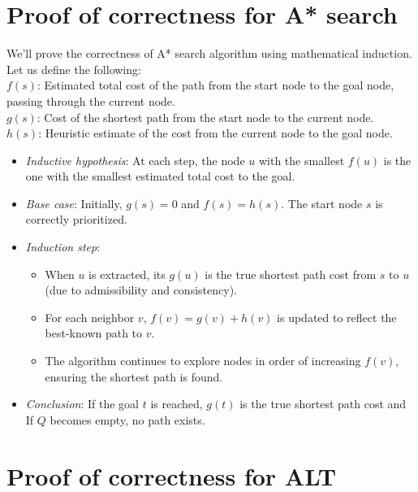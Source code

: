 \begin{appendices}
	\section{Proof of correctness for A* search}\label{appendix:astar:correctness}
	We'll prove the correctness of A* search algorithm using mathematical induction. Let us define the following: \\
	$f(s)$: Estimated total cost of the path from the start node to the goal node, passing through the current node. \\
	$g(s)$: Cost of the shortest path from the start node to the current node. \\
	$h(s)$: Heuristic estimate of the cost from the current node to the goal node.
	\begin{itemize}
		\item \textit{Inductive hypothesis}: At each step, the node $u$ with the smallest $f(u)$ is the one with the smallest estimated total cost to the goal.
		\item \textit{Base case}: Initially, $g(s)=0$ and $f(s)=h(s)$. The start node $s$ is correctly prioritized.
		\item \textit{Induction step}: 
			\begin{itemize}
				\item When $u$ is extracted, its $g(u)$ is the true shortest path cost from $s$ to $u$ (due to admissibility and consistency).
				\item For each neighbor $v$, $f(v)=g(v)+h(v)$ is updated to reflect the best-known path to $v$.
				\item The algorithm continues to explore nodes in order of increasing $f(v)$, ensuring the shortest path is found.
			\end{itemize}
		\item \textit{Conclusion}: If the goal $t$ is reached, $g(t)$ is the true shortest path cost and If $Q$ becomes empty, no path exists.
	\end{itemize}
	
	




\section{Proof of correctness for ALT}\label{appendix:ALT:correctness}



\end{appendices}

